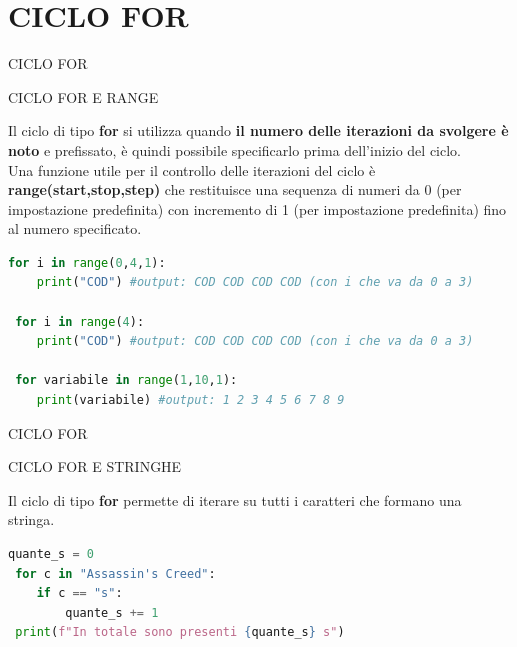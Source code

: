\documentclass[aspectratio=1610]{beamer}
\begin{document}
\section{CICLO FOR}

\begin{frame}[fragile]{CICLO FOR}
    \begin{alertblock}{CICLO FOR E RANGE}
        \begin{minipage}{0.98\linewidth}
            \justifying
            Il ciclo di tipo \textbf{for} si utilizza quando \textbf{il numero delle iterazioni da svolgere è 
            noto} e prefissato, è quindi possibile specificarlo prima dell'inizio del ciclo.\\
            Una funzione utile per il controllo delle iterazioni del ciclo è \textbf{range(start,stop,step)} che 
            restituisce una sequenza di numeri da 0 (per impostazione predefinita) con incremento di 1 
            (per impostazione predefinita) fino al numero specificato.
            \pause
\begin{lstlisting}[language=Python]
 for i in range(0,4,1):
    print("COD") #output: COD COD COD COD (con i che va da 0 a 3)

 for i in range(4):
    print("COD") #output: COD COD COD COD (con i che va da 0 a 3)

 for variabile in range(1,10,1):
    print(variabile) #output: 1 2 3 4 5 6 7 8 9
\end{lstlisting}
        \end{minipage}
    \end{alertblock}
\end{frame}

\begin{frame}[fragile]{CICLO FOR}
    \begin{alertblock}{CICLO FOR E STRINGHE}
        \begin{minipage}{0.98\linewidth}
            \justifying
            Il ciclo di tipo \textbf{for} permette di iterare su tutti i caratteri che formano una stringa.
\begin{lstlisting}[language=Python]
 quante_s = 0
 for c in "Assassin's Creed":
    if c == "s":
        quante_s += 1
 print(f"In totale sono presenti {quante_s} s")
\end{lstlisting}
        \end{minipage}
    \end{alertblock}
\end{frame}
\end{document}
